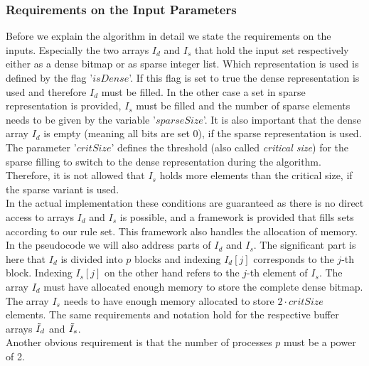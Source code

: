 \subsubsection{Requirements on the Input Parameters} \label{sec:requiremtsOnInputParameter}
Before we explain the algorithm in detail we state the requirements on the inputs. Especially the two arrays $I_d$ and $I_s$ that hold the input set respectively either as a dense bitmap or as sparse integer list. Which representation is used is defined by the flag '$isDense$'. If this flag is set to true the dense representation is used and therefore $I_d$ must be filled. In the other case a set in sparse representation is provided, $I_s$ must be filled and the number of sparse elements needs to be given by the variable '$sparseSize$'. It is also important that the dense array $I_d$ is empty (meaning all bits are set 0), if the sparse representation is used. The parameter '$critSize$' defines the threshold (also called \emph{critical size}) for the sparse filling to switch to the dense representation during the algorithm. Therefore, it is not allowed that $I_s$ holds more elements than the critical size, if the sparse variant is used.\\
In the actual implementation these conditions are guaranteed as there is no direct access to arrays $I_d$ and $I_s$ is possible, and a framework is provided that fills sets according to our rule set. This framework also handles the allocation of memory.\\
In the pseudocode we will also address parts of $I_d$ and $I_s$. The significant part is here that $I_d$ is divided into $p$ blocks and indexing $I_d[j]$ corresponds to the $j$-th
block. Indexing $I_s[j]$ on the other hand refers to the $j$-th element of $I_s$. The array $I_d$ must have allocated enough memory to store the complete dense bitmap. The array $I_s$ needs to have enough memory allocated to store $2\cdot critSize$ elements. The same requirements and notation hold for the respective buffer arrays $\Tilde{I}_d$ and $\Tilde{I}_s$.\\
Another obvious requirement is that the number of processes $p$ must be a power of 2.

